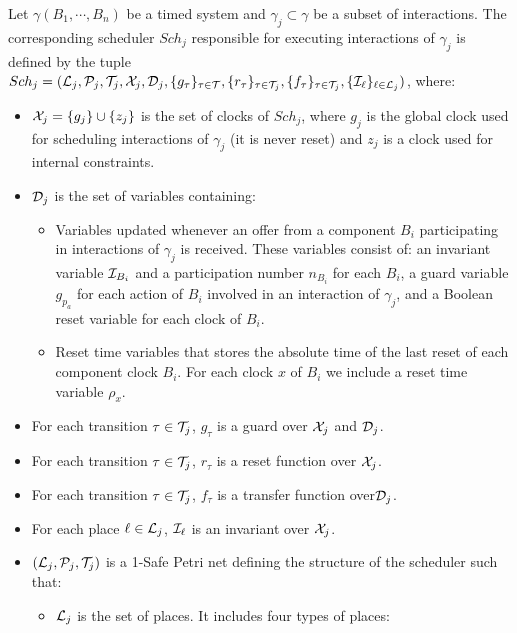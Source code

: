 \begin{definition}[Scheduler]\label{def:sch_sr}
  Let $\gamma(B_1,\cdots,B_n)$ be a timed system and $\gamma_j\subset\gamma$ be a subset of
  interactions. The corresponding scheduler $Sch_j$ responsible for executing interactions
  of $\gamma_j$ is defined by the tuple  
  $Sch_j=(\mathcal{L}_j, \mathcal{P}_j,\mathcal{T}_j,\mathcal{X}_j, \mathcal{D}_j,\{g_{\tau}\}_{\tau\in\mathcal{T}},
  \{r_{\tau}\}_{\tau\in\mathcal{T}_j},\{f_{\tau}\}_{\tau\in\mathcal{T}_j},\{\mathcal{I}_{\ell}\}_{\ell\in\mathcal{L}_j})
  $, where:
  \begin{itemize}
    \item $\mathcal{X}_j=\{g_j\}\cup\{z_j\}$ is the set of clocks of $Sch_j$, where $g_j$ is
      the global clock used for scheduling interactions of $\gamma_j$ (it is never reset)
      and $z_j$ is a clock used for internal constraints. 
    \item $\mathcal{D}_j$ is the set of variables containing:
      \begin{itemize}
        \item Variables updated whenever an offer from a component $B_i$ participating in 
          interactions of $\gamma_j$ is received. These variables consist of: an invariant
          variable $\mathcal{I}_{B_i}$ and a participation number $n_{B_i}$ for each $B_i$, 
          a guard variable $g_{p_a}$ for each action of $B_i$ involved in an interaction of 
          $\gamma_j$, and a Boolean reset variable for each clock of $B_i$.
        \item Reset time variables that stores the absolute time of the last reset of 
          each component clock $B_i$. For each clock $x$ of $B_i$ we include a reset time 
          variable $\rho_x$.
      \end{itemize}
    \item For each transition $\tau\in\mathcal{T}_j$, $g_{\tau}$ is a guard over 
      $\mathcal{X}_j$ and $\mathcal{D}_j$.
    \item For each transition $\tau\in\mathcal{T}_j$, $r_{\tau}$ is a reset function over $\mathcal{X}_j$.
    \item For each transition $\tau\in\mathcal{T}_j$, $f_{\tau}$ is a transfer function over$\mathcal{D}_j$.
    \item For each place $\ell\in\mathcal{L}_j$, $\mathcal{I}_{\ell}$ is an invariant over $\mathcal{X}_j$. 
    \item $(\mathcal{L}_j,\mathcal{P}_j,\mathcal{T}_j)$ is a 1-Safe Petri net defining 
      the structure of the scheduler such that:
      \begin{itemize}
        \item $\mathcal{L}_j$ is the set of places. It includes four types of places:

\end{itemize}
\end{itemize}
\end{definition}

